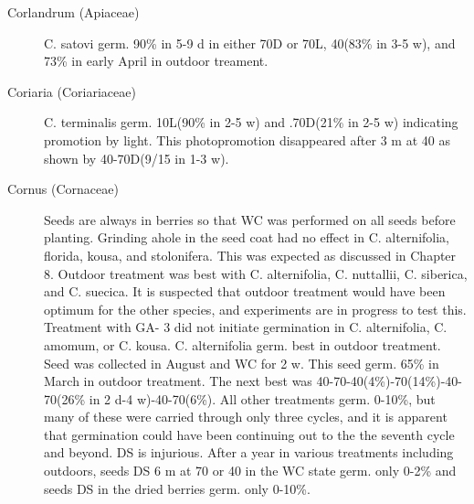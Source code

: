 \begin{description}
\item [Corlandrum (Apiaceae)] C. satovi germ. 90\% in 5-9 d in either 70D or 70L,
40(83\% in 3-5 w), and 73\% in early April in outdoor treament.
\item [Coriaria (Coriariaceae)] C. terminalis germ. 10L(90\% in 2-5 w) and
.70D(21\% in 2-5 w) indicating promotion by light. This photopromotion disappeared
after 3 m at 40 as shown by 40-70D(9/15 in 1-3 w).
\item [Cornus (Cornaceae)] Seeds are always in berries so that WC was
performed on all seeds before planting. Grinding ahole in the seed coat had no effect
in C. alternifolia, florida, kousa, and stolonifera. This was expected as discussed in
Chapter 8. Outdoor treatment was best with C. alternifolia, C. nuttallii, C. siberica, and
C. suecica. It is suspected that outdoor treatment would have been optimum for the
other species, and experiments are in progress to test this. Treatment with GA-
3 did not initiate germination in C. alternifolia, C. amomum, or C. kousa.
C. alternifolia germ. best in outdoor treatment. Seed was collected in August
and WC for 2 w. This seed germ. 65\% in March in outdoor treatment. The next best
was 40-70-40(4\%)-70(14\%)-40-70(26\% in 2 d-4 w)-40-70(6\%). All other treatments
germ. 0-10\%, but many of these were carried through only three cycles, and it is
apparent that germination could have been continuing out to the the seventh cycle and
beyond. DS is injurious. After a year in various treatments including outdoors, seeds
DS 6 m at 70 or 40 in the WC state germ. only 0-2\% and seeds DS in the dried berries
germ. only 0-10\%.


\end{description}
